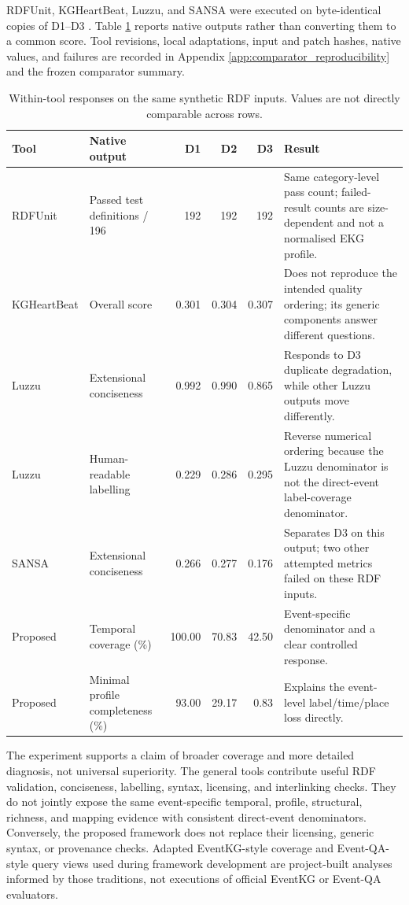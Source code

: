 RDFUnit, KGHeartBeat, Luzzu, and SANSA were executed on byte-identical copies of D1--D3 \citep{testdriven2014,kgheartbeat2024,luzzu2016,sansa2017}. Table \ref{tab:final_external_tools} reports native outputs rather than converting them to a common score. Tool revisions, local adaptations, input and patch hashes, native values, and failures are recorded in Appendix \ref{app:comparator_reproducibility} and the frozen comparator summary.

\begin{table}[htbp]
\centering
\scriptsize
\caption{Within-tool responses on the same synthetic RDF inputs. Values are not directly comparable across rows.}
\label{tab:final_external_tools}
\begin{tabularx}{\textwidth}{>{\raggedright\arraybackslash}p{2.2cm}>{\raggedright\arraybackslash}p{3.3cm}rrrX}
\toprule
Tool & Native output & D1 & D2 & D3 & Result \\
\midrule
RDFUnit & Passed test definitions / 196 & 192 & 192 & 192 & Same category-level pass count; failed-result counts are size-dependent and not a normalised EKG profile. \\
KGHeartBeat & Overall score & 0.301 & 0.304 & 0.307 & Does not reproduce the intended quality ordering; its generic components answer different questions. \\
Luzzu & Extensional conciseness & 0.992 & 0.990 & 0.865 & Responds to D3 duplicate degradation, while other Luzzu outputs move differently. \\
Luzzu & Human-readable labelling & 0.229 & 0.286 & 0.295 & Reverse numerical ordering because the Luzzu denominator is not the direct-event label-coverage denominator. \\
SANSA & Extensional conciseness & 0.266 & 0.277 & 0.176 & Separates D3 on this output; two other attempted metrics failed on these RDF inputs. \\
Proposed & Temporal coverage (\%) & 100.00 & 70.83 & 42.50 & Event-specific denominator and a clear controlled response. \\
Proposed & Minimal profile completeness (\%) & 93.00 & 29.17 & 0.83 & Explains the event-level label/time/place loss directly. \\
\bottomrule
\end{tabularx}
\end{table}

The experiment supports a claim of broader coverage and more detailed diagnosis, not universal superiority. The general tools contribute useful RDF validation, conciseness, labelling, syntax, licensing, and interlinking checks. They do not jointly expose the same event-specific temporal, profile, structural, richness, and mapping evidence with consistent direct-event denominators. Conversely, the proposed framework does not replace their licensing, generic syntax, or provenance checks. Adapted EventKG-style coverage and Event-QA-style query views used during framework development are project-built analyses informed by those traditions, not executions of official EventKG or Event-QA evaluators.

